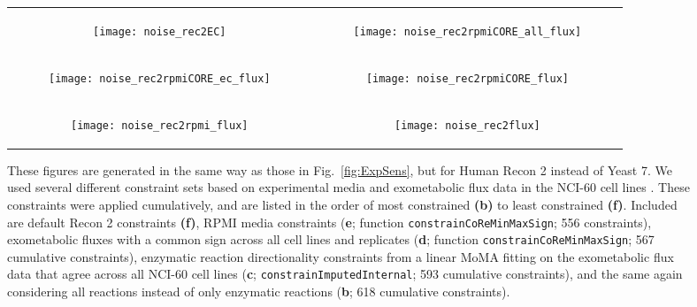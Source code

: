 \begin{figure}[!htb]
\begin{tabular}{cc}
  \begin{subfigure}[b]{0.5\textwidth}
  \texttt{[image: noise\_rec2EC]}
  \caption{} \label{fig:ExpSensRec2:A}
  \end{subfigure}
&
  \begin{subfigure}[b]{0.5\textwidth}
  \texttt{[image: noise\_rec2rpmiCORE\_all\_flux]}
  \caption{} \label{fig:ExpSensRec2:B}
  \end{subfigure} 
\\
  \begin{subfigure}[b]{0.5\textwidth}
  \texttt{[image: noise\_rec2rpmiCORE\_ec\_flux]}
  \caption{} \label{fig:ExpSensRec2:C}
  \end{subfigure} 
&
  \begin{subfigure}[b]{0.5\textwidth}
  \texttt{[image: noise\_rec2rpmiCORE\_flux]}
  \caption{} \label{fig:ExpSensRec2:D}
  \end{subfigure} 
\\
  \begin{subfigure}[b]{0.5\textwidth}
  \texttt{[image: noise\_rec2rpmi\_flux]}
  \caption{} \label{fig:ExpSensRec2:E}
  \end{subfigure} 
&
  \begin{subfigure}[b]{0.5\textwidth}
  \texttt{[image: noise\_rec2flux]}
  \caption{} \label{fig:ExpSensRec2:F}
  \end{subfigure} 
\\
\end{tabular}
\caption{ These figures are generated in the same way as those in
Fig.~\ref{fig:ExpSens}, but for Human Recon 2 instead of Yeast 7. We
used several different constraint sets based on experimental media and
exometabolic flux data in the NCI-60 cell lines
\citep{Jain2012}. These constraints were applied cumulatively, and are
listed in the order of most constrained \textbf{(b)} to least
constrained \textbf{(f)}. Included are default Recon 2 constraints
\textbf{(f)}, RPMI media constraints (\textbf{e}; function
\texttt{constrainCoReMinMaxSign}; 556 constraints), exometabolic
fluxes with a common sign across all cell lines and replicates
(\textbf{d}; function \texttt{constrainCoReMinMaxSign}; 567 cumulative
constraints), enzymatic reaction directionality constraints from a
linear MoMA fitting on the exometabolic flux data that agree across
all NCI-60 cell lines (\textbf{c};
\texttt{constrainImputed\-Internal}; 593 cumulative constraints), and
the same again considering all reactions instead of only enzymatic
reactions (\textbf{b}; 618 cumulative constraints).}
\label{fig:ExpSensRec2}
\end{figure}
\FloatBarrier


